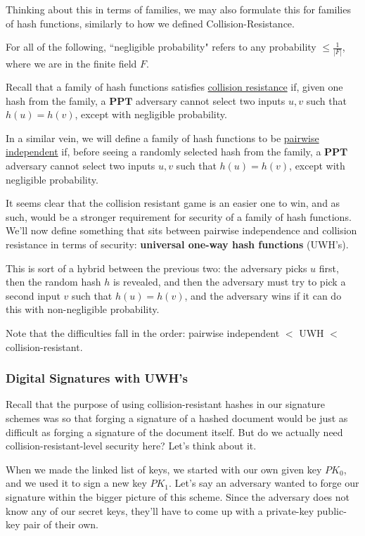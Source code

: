 \documentclass[11pt]{article}
\newcommand{\PPT}{\mathbf{PPT}}
\begin{document}
Thinking about this in terms of families, we may also formulate this for families of hash functions, similarly to how we defined Collision-Resistance.\medskip

For all of the following, ``negligible probability" refers to any probability \(\le\frac{1}{|F|}\), where we are in the finite field \(F\).

Recall that a family of hash functions satisfies \underline{collision resistance} if, given one hash from the family, a \(\PPT\) adversary cannot select two inputs \(u,v\) such that \(h(u)=h(v)\), except with negligible probability.\smallskip

In a similar vein, we will define a family of hash functions to be \underline{pairwise independent} if, before seeing a randomly selected hash from the family, a \(\PPT\) adversary cannot select two inputs \(u,v\) such that \(h(u)=h(v)\), except with negligible probability. \medskip

It seems clear that the collision resistant game is an easier one to win, and as such, would be a stronger requirement for security of a family of hash functions. We'll now define something that sits between pairwise independence and collision resistance in terms of security: \textbf{universal one-way hash functions} (UWH's).\smallskip

This is sort of a hybrid between the previous two: the adversary picks \(u\) first, then the random hash \(h\) is revealed, and then the adversary must try to pick a second input \(v\) such that \(h(u)=h(v)\), and the adversary wins if it can do this with non-negligible probability.\medskip

Note that the difficulties fall in the order: pairwise independent \(<\) UWH \(<\) collision-resistant. 

\subsubsection{Digital Signatures with UWH's}

Recall that the purpose of using collision-resistant hashes in our signature schemes was so that forging a signature of a hashed document would be just as difficult as forging a signature of the document itself. But do we actually need collision-resistant-level security here? Let's think about it.\medskip

When we made the linked list of keys, we started with our own given key \(PK_0\), and we used it to sign a new key \(PK_1\). Let's say an adversary wanted to forge our signature within the bigger picture of this scheme. Since the adversary does not know any of our secret keys, they'll have to come up with a private-key public-key pair of their own.\smallskip
\end{document}
